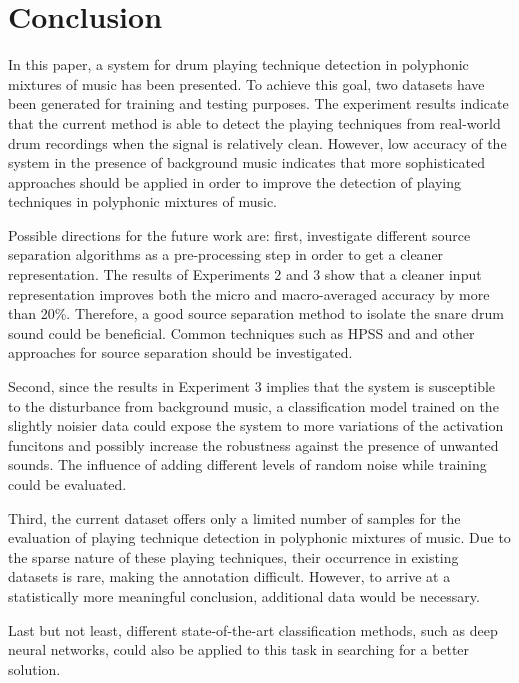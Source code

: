 \documentclass{article}
\begin{document}
\section{Conclusion}
\label{sec:conclusion}
In this paper, a system for drum playing technique detection in polyphonic mixtures of music has been presented. To achieve this goal, two datasets have been generated for training and testing purposes. The experiment results indicate that the current method is able to detect the playing techniques from real-world drum recordings when the signal is relatively clean. However, low accuracy of the system in the presence of background music indicates that more sophisticated approaches should be applied in order to improve the detection of playing techniques in polyphonic mixtures of music. 

Possible directions for the future work are: first, investigate different source separation algorithms as a pre-processing step in order to get a cleaner representation. The results of Experiments 2 and 3 show that a cleaner input representation improves both the micro and macro-averaged accuracy by more than 20\%. Therefore, a good source separation method to isolate the snare drum sound could be beneficial. Common techniques such as HPSS and and other approaches for source separation should be investigated.

Second, since the results in Experiment 3 implies that the system is susceptible to the disturbance from background music, a classification model trained on the slightly noisier data could expose the system to more variations of the activation funcitons and possibly increase the robustness against the presence of unwanted sounds. The influence of adding different levels of random noise while training could be evaluated. 

Third, the current dataset offers only a limited number of samples for the evaluation of playing technique detection in polyphonic mixtures of music. Due to the sparse nature of these playing techniques, their occurrence in existing datasets is rare, making the annotation difficult. However, to arrive at a statistically more meaningful conclusion, additional data would be necessary. 

Last but not least, different state-of-the-art classification methods, such as deep neural networks, could also be applied to this task in searching for a better solution.

\end{document}
